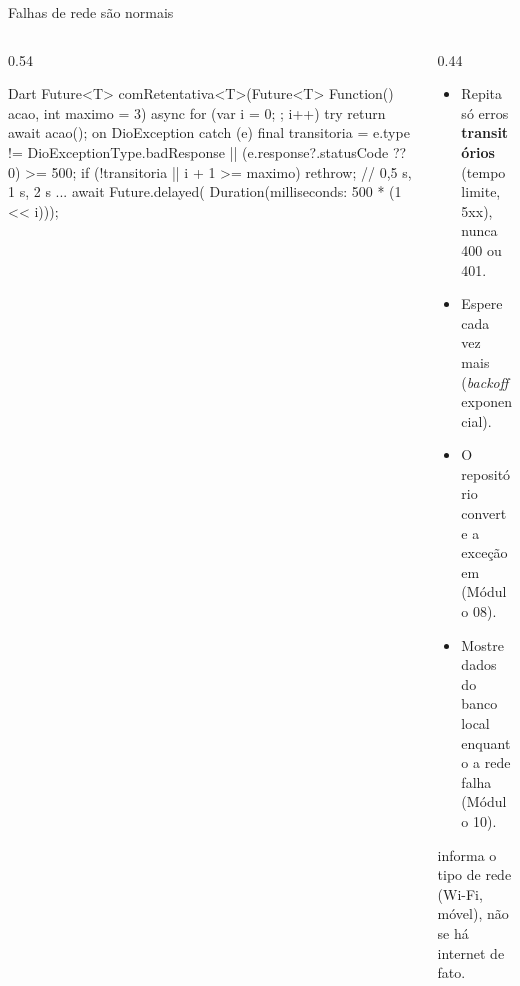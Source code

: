 \documentclass[aspectratio=169,10pt]{beamer}
\begin{document}
\begin{frame}[fragile]{Falhas de rede são normais}
  \begin{columns}[T]
    \begin{column}{0.54\textwidth}
\begin{codigo}[title=utils/retentativa.dart]{Dart}
Future<T> comRetentativa<T>(Future<T> Function() acao,
    {int maximo = 3}) async {
  for (var i = 0; ; i++) {
    try {
      return await acao();
    } on DioException catch (e) {
      final transitoria =
          e.type != DioExceptionType.badResponse ||
          (e.response?.statusCode ?? 0) >= 500;
      if (!transitoria || i + 1 >= maximo) rethrow;
      // 0,5 s, 1 s, 2 s ...
      await Future.delayed(
          Duration(milliseconds: 500 * (1 << i)));
    }
  }
}
\end{codigo}
    \end{column}
    \begin{column}{0.44\textwidth}
      \begin{conceito}[Estratégia]
        \begin{itemize}
          \item Repita só erros \textbf{transitórios} (tempo limite, 5xx), nunca 400 ou 401.
          \item Espere cada vez mais (\emph{backoff} exponencial).
          \item O repositório converte a exceção em  (Módulo 08).
          \item Mostre dados do banco local enquanto a rede falha (Módulo 10).
        \end{itemize}
      \end{conceito}
      \begin{dica}
         informa o tipo de rede (Wi-Fi, móvel), não se há internet de fato.
      \end{dica}
    \end{column}
  \end{columns}
\end{frame}
\end{document}
